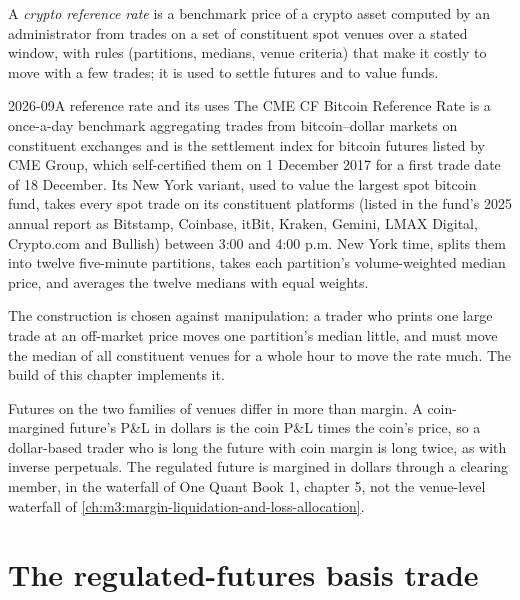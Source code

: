 \begin{definition}\label{def:m3:dated-futures-options-and-etfs:rate}
A \emph{crypto reference rate} is a benchmark price of a crypto asset computed by an
administrator from trades on a set of constituent spot venues over a stated window, with rules (partitions,
medians, venue criteria) that make it costly to move with a few trades; it is used to settle futures and to value
funds.
\end{definition}

\begin{dated}{2026-09}{A reference rate and its uses}\label{dat:m3:dated-futures-options-and-etfs:brr}
The CME CF Bitcoin Reference Rate is a once-a-day benchmark aggregating trades from bitcoin--dollar markets on
constituent exchanges and is the settlement index for bitcoin futures listed by CME Group, which self-certified them on
1 December 2017 for a first trade date of 18 December. Its New York variant,
used to value the largest spot bitcoin fund, takes every spot trade on its constituent platforms (listed in the
fund's 2025 annual report as Bitstamp, Coinbase, itBit, Kraken, Gemini, LMAX Digital, Crypto.com and Bullish)
between 3:00 and 4:00 p.m. New York time, splits them into twelve five-minute partitions, takes each partition's
volume-weighted median price, and averages the twelve medians with equal weights.
\end{dated}

The construction is chosen against manipulation: a trader who prints one large trade at an off-market price moves
one partition's median little, and must move the median of all constituent venues for a whole hour to move the
rate much. The build of this chapter implements it.

Futures on the two families of venues differ in more than margin. A coin-margined future's P\&L in dollars is the
coin P\&L times the coin's price, so a dollar-based trader who is long the future with coin margin is long twice, as
with inverse perpetuals. The regulated future is margined in dollars through a clearing member, in the waterfall of
One Quant Book 1, chapter 5, not the venue-level waterfall of \cref{ch:m3:margin-liquidation-and-loss-allocation}.

\section{The regulated-futures basis trade}

